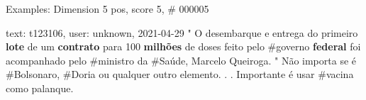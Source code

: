 \begin{frame}{Examples: Dimension 5 pos, score 5, \# 000005}
\footnotesize
\begin{exampleblock}{text: t123106, user: unknown, 2021-04-29}
" O desembarque e entrega do primeiro \textbf{lote} de um \textbf{contrato} 
para 100 \textbf{milhões} de doses feito pelo \#governo \textbf{federal} foi 
acompanhado pelo \#ministro da \#Saúde, Marcelo Queiroga. " Não importa se é 
\#Bolsonaro, \#Doria ou qualquer outro elemento. . . Importante é usar \#vacina 
como palanque. 
\end{exampleblock}
\end{frame}
